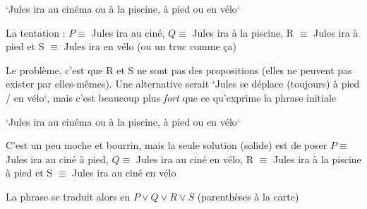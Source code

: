 \begin{frame}


`Jules ira au cinéma ou à la piscine, à pied ou en vélo`\pause\newline

La tentation : $P \equiv $ Jules ira au ciné, $Q \equiv $ Jules ira à la piscine, R $\equiv$ Jules ira à pied et S $\equiv$ Jules ira en vélo (ou un truc comme ça)\pause\newline 

Le problème, c'est que R et S ne sont pas des propositions (elles ne peuvent pas exister par elles-mêmes). \pause Une alternative serait `Jules se déplace (toujours) à pied / en vélo`, mais c'est  beaucoup plus \textit{fort} que ce qu'exprime la phrase initiale


\end{frame}

\begin{frame}


`Jules ira au cinéma ou à la piscine, à pied ou en vélo`\pause\newline

C'est un peu moche et bourrin, mais la seule solution (solide) est de poser $P \equiv $ Jules ira au ciné à pied, $Q \equiv $ Jules ira au ciné en vélo, R $\equiv$ Jules ira à la piscine à pied et S $\equiv$ Jules ira au ciné en vélo\pause\newline

La phrase se traduit alors en $P \vee Q \vee R \vee S$ (parenthèses à la carte)
\vspace{0.48cm}

\end{frame}


